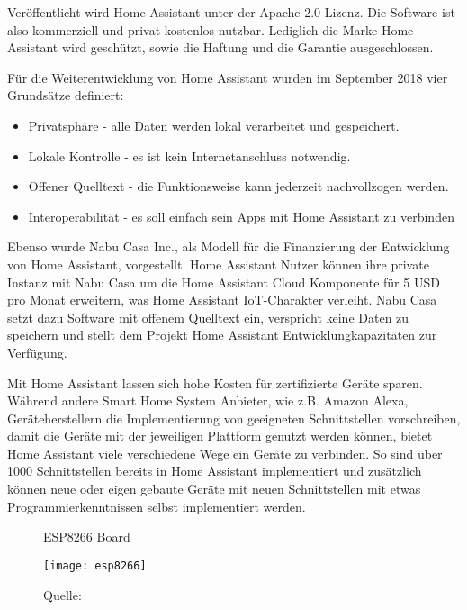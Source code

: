 Veröffentlicht wird Home Assistant unter der Apache 2.0 Lizenz.
Die Software ist also kommerziell und privat kostenlos nutzbar.
Lediglich die Marke Home Assistant wird geschützt, sowie die Haftung und die Garantie ausgeschlossen.

Für die Weiterentwicklung von Home Assistant wurden im September 2018 vier Grundsätze definiert:

\begin{itemize}
	\item Privatsphäre - alle Daten werden lokal verarbeitet und gespeichert.
	\item Lokale Kontrolle - es ist kein Internetanschluss notwendig.
	\item Offener Quelltext - die Funktionsweise kann jederzeit nachvollzogen werden.
	\item Interoperabilität - es soll einfach sein Apps mit Home Assistant zu verbinden
\end{itemize}

Ebenso wurde Nabu Casa Inc., als Modell für die Finanzierung der Entwicklung von Home Assistant, vorgestellt.
Home Assistant Nutzer können ihre private Instanz mit Nabu Casa um die Home Assistant Cloud Komponente für 5 USD pro Monat erweitern, was Home Assistant \ac{IoT}-Charakter verleiht.
Nabu Casa setzt dazu Software mit offenem Quelltext ein, verspricht keine Daten zu speichern und stellt dem Projekt Home Assistant Entwicklungkapazitäten zur Verfügung.

Mit Home Assistant lassen sich hohe Kosten für zertifizierte Geräte sparen.
Während andere Smart Home System Anbieter, wie z.B. Amazon Alexa, Geräteherstellern die Implementierung von geeigneten Schnittstellen vorschreiben, damit die Geräte mit der jeweiligen Plattform genutzt werden können, bietet Home Assistant viele verschiedene Wege ein Geräte zu verbinden.
So sind über 1000 Schnittstellen bereits in Home Assistant implementiert und zusätzlich können neue oder eigen gebaute Geräte mit neuen Schnittstellen mit etwas Programmierkenntnissen selbst implementiert werden.

\begin{wrapfigure}{r}{0.4\textwidth}
	\centering
	\caption{ESP8266 Board}
	\texttt{[image: esp8266]}
	\caption*{\footnotesize{Quelle: }}
	\label{fig:esp8266}
\end{wrapfigure}

